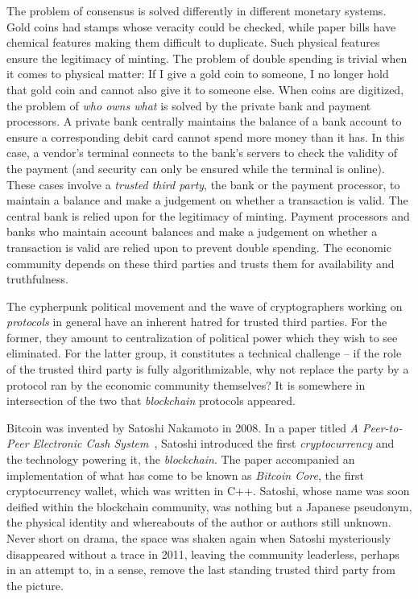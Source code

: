 The problem of consensus is solved differently in different monetary systems. Gold
coins had stamps whose veracity could be checked, while paper bills have chemical
features making them difficult to duplicate. Such physical features ensure the
legitimacy of minting. The problem of double spending is trivial when it comes to
physical matter: If I give a
gold coin to someone, I no longer hold that gold coin and cannot also give it to
someone else. When coins are digitized, the problem of \emph{who owns what}
is solved by the private bank and payment processors.
A private bank centrally maintains the balance of a bank account to ensure a
corresponding debit card cannot spend more money than it has. In this case, a
vendor's terminal connects to the bank's servers to check the validity of the
payment (and security can only be ensured while the terminal is online). These
cases involve a \emph{trusted third party}, the
bank or the payment processor, to maintain a balance and make a judgement on
whether a transaction is valid. The central bank is relied upon for the
legitimacy of minting. Payment processors and banks who maintain account
balances and make a judgement on whether a transaction is valid are relied upon
to prevent double spending. The economic community depends on these third
parties and trusts them for availability and truthfulness.

The cypherpunk political movement and the wave of
cryptographers working on \emph{protocols} in general have an inherent hatred
for trusted third parties. For the former, they amount to
centralization of political power which they wish to see eliminated. For the
latter group, it constitutes a technical challenge -- if the role of the trusted
third party is fully algorithmizable, why not replace the party by a protocol
ran by the economic community themselves? It is somewhere in intersection of the
two that \emph{blockchain} protocols appeared.

Bitcoin was invented by Satoshi Nakamoto
in 2008. In a paper titled
\emph{A Peer-to-Peer Electronic Cash System}~\cite{bitcoin}, Satoshi introduced
the first \emph{cryptocurrency} and the technology powering it, the
\emph{blockchain}. The paper accompanied an implementation of what has come to
be known as \emph{Bitcoin Core}, the first cryptocurrency
wallet, which was written in C++. Satoshi, whose name was soon deified within
the blockchain community, was nothing but a Japanese pseudonym, the
physical identity and whereabouts of the author or authors still unknown. Never
short on drama, the space was shaken again when Satoshi mysteriously disappeared
without a trace in 2011, leaving the community leaderless, perhaps in an attempt
to, in a sense, remove the last standing trusted third party from the picture.

